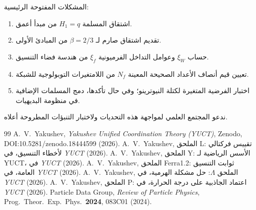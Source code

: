 \documentclass[12pt,a4paper]{article}
\begin{document}
	المشكلات المفتوحة الرئيسية:
	\begin{enumerate}[label=(\roman*)]
		\item اشتقاق المسلمة \(H_1 = q\) من مبدأ أعمق.
		\item تقديم اشتقاق صارم لـ \(\beta = 2/3\) من المبادئ الأولى.
		\item حساب \(\xi_W\) وعوامل التداخل الفرميونية \(\xi_f\) من هندسة فضاء التنسيق.
		\item تعيين قيم أنصاف الأعداد الصحيحة المعينة \(N_f\) من اللامتغيرات التوبولوجية للشبكة.
		\item اختبار الفرضية المتغيرة لكتلة النيوترينو؛ وفي حال تأكدها، دمج المسلمات الإضافية في منظومة البديهيات.
	\end{enumerate}
	ندعو المجتمع العلمي لمواجهة هذه التحديات ولاختبار التنبؤات المطروحة أعلاه.
	
	\begin{thebibliography}{99}
		 A.~V.~Yakushev, \emph{Yakushev Unified Coordination Theory (YUCT)}, Zenodo, DOI:10.5281/zenodo.18444599 (2026).
		 A.~V.~Yakushev, الملحق L: تقييس فركتالي لأخطاء التنسيق، في \emph{YUCT} (2026).
		 A.~V.~Yakushev, الملحق Y: الأسس الرياضية لـ YUCT، في \emph{YUCT} (2026).
		 A.~V.~Yakushev, الملحق Ferra1.2: ثوابت التنسيق العامة، في \emph{YUCT} (2026).
		 A.~V.~Yakushev, الملحق \(\Lambda\): حل مشكلة الهرمية، في \emph{YUCT} (2026).
		 A.~V.~Yakushev, الملحق P: اعتماد الجاذبية على درجة الحرارة، في \emph{YUCT} (2026).
		 Particle Data Group, \emph{Review of Particle Physics}, Prog.\ Theor.\ Exp.\ Phys.\ \textbf{2024}, 083C01 (2024).
	\end{thebibliography}
	
\end{document}
